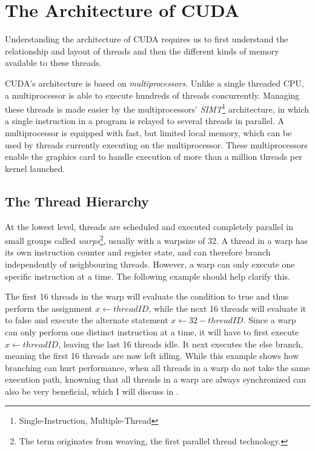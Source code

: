 \section{The Architecture of CUDA}

Understanding the architecture of CUDA requires us to first understand
the relationship and layout of threads and then the different kinds of
memory available to these threads.

CUDA's architecture is based on \textit{multiprocessors}. Unlike a
single threaded CPU, a multiprocessor is able to execute hundreds of
threads concurrently. Managing these threads is made easier by the
multiprocessors' \textit{SIMT}\footnote{Single-Instruction,
  Multiple-Thread} architecture, in which a single instruction in a
program is relayed to several threads in parallel. A multiprocessor is
equipped with fast, but limited local memory, which can be used by
threads currently executing on the multiprocessor. These
multiprocessors enable the graphics card to handle execution of more
than a million threads per kernel launched.


\subsection{The Thread Hierarchy}\label{sec:threadHierarchy}



At the lowest level, threads are scheduled and executed completely
parallel in small groups called \textit{warps}\footnote{The term
  originates from weaving, the first parallel thread
  technology.}, usually with a warpsize of 32. A
thread in a warp has its own instruction counter and register state,
and can therefore branch independently of neighbouring
threads. However, a warp can only execute one specific instruction at
a time. The following example should help clarify this.

\begin{algorithmic}
  \ELSE
  \ENDIF
\end{algorithmic}


The first 16 threads in the warp will evaluate the condition to true
and thus perform the assignment $x \leftarrow threadID$, while the
next 16 threads will evaluate it to false and execute the alternate
statement $x \leftarrow 32 - threadID$. Since a warp can only
perform one distinct instruction at a time, it will have to first
execute $x \leftarrow threadID$, leaving the last 16 threads idle. It
next executes the else branch, meaning the first 16 threads are now
left idling. While this example shows how branching can hurt
performance, when all threads in a warp do not take the same execution
path, knowning that all threads in a warp are always synchronized can
also be very beneficial, which I will discuss in
.

